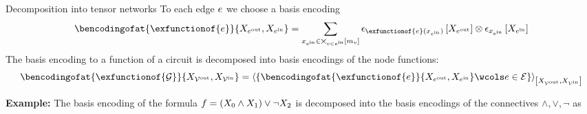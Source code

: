 \documentclass{beamer}
\begin{document}
    \begin{frame}{Decomposition into tensor networks}
        To each edge $e$ we choose a basis encoding
        \begin{align*}
            \bencodingofat{\exfunctionof{\edge}}{\catvariableof{\outgoingnodes},\catvariableof{\incomingnodes}}
            = \sum_{\catindexof{\incomingnodes}\in \bigtimes_{\node\in\incomingnodes}[\catdimof{\node}]}
            \onehotmapofat{\exfunctionof{\edge}(\catindexof{\incomingnodes})}{\catvariableof{\outgoingnodes}}
            \otimes \onehotmapofat{\catindexof{\incomingnodes}}{\catvariableof{\incomingnodes}}
        \end{align*}
        The basis encoding to a function of a circuit is decomposed into basis encodings of the node functions:
        \begin{align*}
            \bencodingofat{\exfunctionof{\graph}}{
                \catvariableof{\outnodes},\catvariableof{\innodes}
            }
            = \contractionof{
                \{\bencodingofat{\exfunctionof{\edge}}{\catvariableof{\outgoingnodes},\catvariableof{\incomingnodes}} \wcols \edge\in\edges\}
            }{\catvariableof{\outnodes},\catvariableof{\innodes}}
        \end{align*}


            {\bf Example:} The basis encoding of the formula $f=(X_{0}\land X_{1})\lor \lnot X_{2}$ is decomposed into the basis encodings of the connectives $\land,\lor,\lnot$ as
\end{frame}
\end{document}
